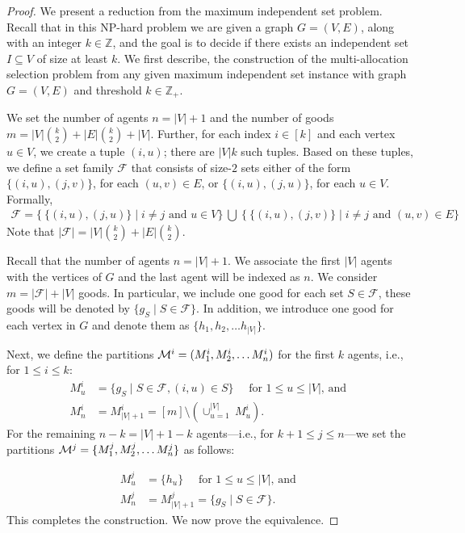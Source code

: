 \begin{proof}
   We present a reduction from the maximum independent set problem. Recall that in this {\rm NP}-hard problem we are given a graph $G = (V, E)$, along with  an integer $k \in \mathbb{Z}$, and the goal is to decide if there exists an independent set $I \subseteq V$ of size at least $k$. We first describe, the construction of the multi-allocation selection problem from any given maximum independent set instance with graph $G= (V, E)$ and threshold $k \in \mathbb{Z}_+$.    
   
We set the number of agents $n = |V|+1$ and the number of goods $m = |V|\binom{k}{2} + |E| \binom{k}{2} + |V|$. Further, for each index $i \in [k]$ and each vertex $u \in V$, we create a tuple $(i, u)$; there are $|V| k$ such tuples. Based on these tuples, we define a set family $\mathcal{F}$ that consists of size-$2$ sets either of the form $\{(i, u), (j, v)\}$, for each $(u, v) \in E$, or $\{(i, u), (j, u)\}$, for each $u \in V$. Formally, 
\begin{align*}
\mathcal{F} = \Big\{ \  \{(i, u), (j, u)\} \mid  i \neq j \text{ and } u \in V \Big\}~\bigcup~\Big\{ \ \{ (i, u), (j, v) \} \mid i \neq j \text{ and } (u, v) \in E \Big\}
\end{align*}
Note that $|\mathcal{F}| = |V|\binom{k}{2} + |E| \binom{k}{2}$.

Recall that the number of agents $n = |V| + 1$. We associate the first $|V|$ agents with the vertices of $G$ and the last agent will be indexed as $n$. We consider $m = |\mathcal{F}|+|V|$ goods. In particular, we include one good for each set $S \in \mathcal{F}$, these goods will be denoted by $\{g_S \mid S \in \mathcal{F}\}$. In addition, we introduce one good for each vertex in $G$ and denote them as $\{h_1, h_2, \ldots h_{|V|}\}$. 

Next, we define the partitions $\mathcal{M}^i = (M^i_1, M^i_2, \ldots M^i_{n})$ for the first $k$ agents, i.e., for $ 1 \leq i \leq k$: 
\begin{align*}
M^i_u  & = \{g_S \mid S \in \mathcal{F} , (i, u) \in S\} \quad \text{ for $1 \leq u \leq |V|$, and } \\ 
M^i_n &  = M^i_{|V|+1}  = [m] \setminus \left( \cup_{u=1}^{|V|} \ M^i_u \right).
\end{align*}
For the remaining $n-k = |V|+1-k$ agents---i.e., for $k+1 \leq j \leq n$---we set the partitions $\mathcal{M}^j = \{M^j_1, M^j_2, \ldots M^j_{n}\}$ as follows:

\begin{align*}
M^j_u  & = \{ h_u \} \quad \text{ for $1 \leq u \leq |V|$, and } \\  
M^j_n & = M^j_{|V|+1}  =  \{g_S \mid S \in \mathcal{F}\}.
\end{align*}
This completes the construction. We now prove the equivalence.


\end{proof}
